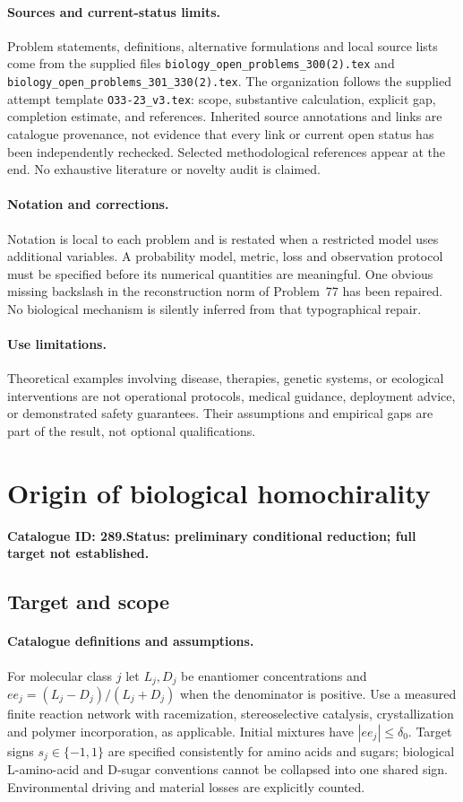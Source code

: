\documentclass[11pt]{article}
\begin{document}
\paragraph{Sources and current-status limits.}
Problem statements, definitions, alternative formulations and local source lists
come from the supplied files
\texttt{biology\_open\_problems\_300(2).tex} and
\texttt{biology\_open\_problems\_301\_330(2).tex}.
The organization follows the supplied attempt template
\texttt{O33-23\_v3.tex}: scope, substantive calculation, explicit gap,
completion estimate, and references. Inherited source annotations and links are
catalogue provenance, not evidence that every link or current open status has
been independently rechecked. Selected methodological references appear at the
end. No exhaustive literature or novelty audit is claimed.

\paragraph{Notation and corrections.}
Notation is local to each problem and is restated when a restricted model uses
additional variables. A probability model, metric, loss and observation protocol
must be specified before its numerical quantities are meaningful. One obvious
missing backslash in the reconstruction norm of Problem~77 has been repaired.
No biological mechanism is silently inferred from that typographical repair.

\paragraph{Use limitations.}
Theoretical examples involving disease, therapies, genetic systems, or ecological
interventions are not operational protocols, medical guidance, deployment advice,
or demonstrated safety guarantees. Their assumptions and empirical gaps are part
of the result, not optional qualifications.

\setcounter{section}{288}
\section{Origin of biological homochirality}
\label{prob:289}
\noindent\textbf{Catalogue ID: 289.}\quad \textbf{Status: preliminary conditional reduction; full target not established.}
\subsection{Target and scope}
\paragraph{Catalogue definitions and assumptions.}
For molecular class $j$ let $L_j,D_j$ be enantiomer concentrations and $ee_j=(L_j-D_j)/(L_j+D_j)$ when the denominator is positive. Use a measured finite reaction network with racemization, stereoselective catalysis, crystallization and polymer incorporation, as applicable. Initial mixtures have $|ee_j|\leq\delta_0$. Target signs $s_j\in\{-1,1\}$ are specified consistently for amino acids and sugars; biological L-amino-acid and D-sugar conventions cannot be collapsed into one shared sign. Environmental driving and material losses are explicitly counted.
\end{document}
